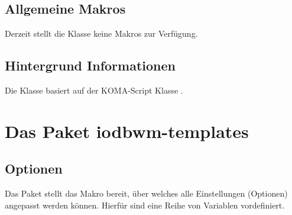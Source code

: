 \documentclass[babel=ngerman,highlight=false]{skdoc}
\begin{document}
        \subsection{Allgemeine Makros}
            Derzeit stellt die Klasse keine Makros zur Verfügung.
            
        \subsection{Hintergrund Informationen}
            Die Klasse basiert auf der KOMA-Script Klasse .

    \section{Das Paket iodbwm-templates}\label{pkg:iodhbwm-templates}
        \subsection{Optionen}
            Das Paket stellt das Makro  bereit, über welches alle Einstellungen (Optionen) angepasst werden können. Hierfür sind eine Reihe von  Variablen vordefiniert.\bigskip
            
            \bigskip
            
            \bigskip
            
            \bigskip
            
            \WithValues{}\bigskip
            
            \WithValues{}\bigskip
            
            \WithValues{}\bigskip
            
            \AndDefault{\today}\bigskip
            
            \WithValues{}\bigskip
            
            \WithValues{}\bigskip
            
            \WithValues{}\bigskip
            
            \WithValues{}\bigskip
            
\end{document}
